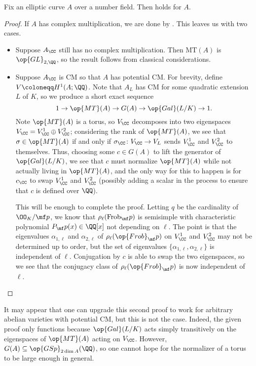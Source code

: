 \documentclass{article}
\begin{document}
\begin{proposition}
	Fix an elliptic curve $A$ over a number field. Then  holds for $A$.
\end{proposition}
\begin{proof}
	If $A$ has complex multiplication, we are done by . This leaves us with two cases.
	\begin{itemize}
		\item Suppose $A_\CC$ still has no complex multiplication. Then $\mathrm{MT}(A)$ is $\op{GL}_{2,\QQ}$, so the result follows from classical considerations.
		\item Suppose $A_\CC$ is CM so that $A$ has potential CM. For brevity, define $V\coloneqq H^1(A;\QQ)$. Note that $A_L$ has CM for some quadratic extension $L$ of $K$, so we produce a short exact sequence
		\[1\to\op{MT}(A)\to G(A)\to\op{Gal}(L/K)\to1.\]
		Note $\op{MT}(A)$ is a torus, so $V_\CC$ decomposes into two eigenspaces $V_\CC=V^1_\CC\oplus V^2_\CC$; considering the rank of $\op{MT}(A)$, we see that $\sigma\in\op{MT}(A)$ if and only if $\sigma_\CC\colon V_\CC\to V_L$ sends $V^1_\CC$ and $V^2_\CC$ to themselves. Thus, choosing some $c\in G(A)$ to lift the generator of $\op{Gal}(L/K)$, we see that $c$ must normalize $\op{MT}(A)$ while not actually living in $\op{MT}(A)$, and the only way for this to happen is for $c_\CC$ to swap $V^1_\CC$ and $V^2_\CC$ (possibly adding a scalar in the process to ensure that $c$ is defined over $\QQ$).
		
		This will be enough to complete the proof. Letting $q$ be the cardinality of $\OO_K/\mf p$, we know that $\rho_\ell(\mathrm{Frob}_\mf p)$ is semisimple with characteristic polynomial $P_\mf p(x)\in\QQ[x]$ not depending on $\ell$. The point is that the eigenvalues $\alpha_{1,\ell}$ and $\alpha_{2,\ell}$ of $\rho_\ell(\op{Frob}_\mf p)$ on $V^1_\CC$ and $V^2_\CC$ may not be determined up to order, but the set of eigenvalues $\{\alpha_{1,\ell},\alpha_{2,\ell}\}$ is independent of $\ell$. Conjugation by $c$ is able to swap the two eigenspaces, so we see that the conjugacy class of $\rho_\ell(\op{Frob}_\mf p)$ is now independent of $\ell$.
		\qedhere
	\end{itemize}
\end{proof}
\begin{remark}
	It may appear that one can upgrade this second proof to work for arbitrary abelian varieties with potential CM, but this is not the case. Indeed, the given proof only functions because $\op{Gal}(L/K)$ acts simply transitively on the eigenspaces of $\op{MT}(A)$ acting on $V_\CC$. However, $G(A)\subseteq\op{GSp}_{2\dim A}(\QQ)$, so one cannot hope for the normalizer of a torus to be large enough in general.
\end{remark}
\end{document}

